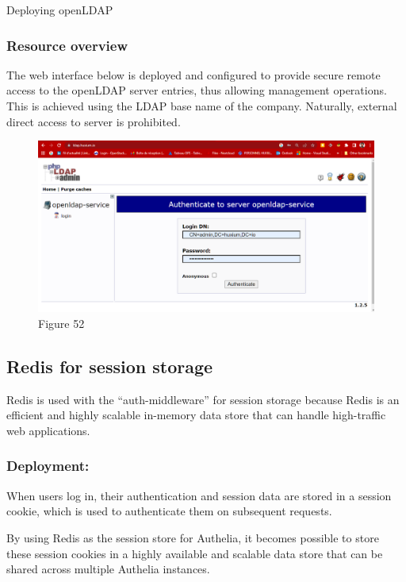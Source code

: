 \begin{listing}[H]
\inputminted[firstline=56]{Yaml}{codeListing/deploy_openldap.yml}
\caption{Deploying openLDAP}
\label{lst:Deploying_openLDAP}
\end{listing} 

\subsubsection{Resource overview }

The web interface below is deployed and configured to provide secure remote access to the openLDAP server entries, thus allowing management operations. This is achieved using the LDAP base name of the company. Naturally, external direct access to server is prohibited. 
\begin{figure}[H]\centering
\includegraphics[width=1.0\textwidth,angle=00]{assets/f52.png}
\caption{Figure 52 }
\label{fig:f52}
\end{figure} 

\subsection{Redis for session storage }

Redis is used with the “auth-middleware” for session storage because Redis is an efficient and highly scalable in-memory data store that can handle high-traffic web applications. 

\subsubsection{Deployment:} 

When users log in, their authentication and session data are stored in a session cookie, which is used to authenticate them on subsequent requests. 

By using Redis as the session store for Authelia, it becomes possible to store these session cookies in a highly available and scalable data store that can be shared across multiple Authelia instances.  

